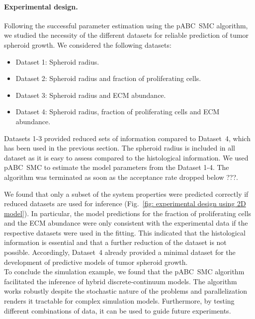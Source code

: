 \documentclass[10pt,letterpaper]{article}
\newcommand{\jh}[1]{{\color{red}#1}}
\begin{document}
\paragraph*{Experimental design.}
Following the successful parameter estimation using the pABC~SMC algorithm, we studied the necessity of the different datasets for reliable prediction of tumor spheroid growth. We considered the following datasets:
\begin{itemize}
\item Dataset 1: Spheroid radius.
\item Dataset 2: Spheroid radius and fraction of proliferating cells.
\item Dataset 3: Spheroid radius and ECM abundance.
\item Dataset 4: Spheroid radius, fraction of proliferating cells and ECM abundance.
\end{itemize}
Datasets 1-3 provided reduced sets of information compared to Dataset~4, which has been used in the previous section. The spheroid radius is included in all dataset as it is easy to assess compared to the histological information. We used pABC~SMC to estimate the model parameters from the Dataset 1-4. The algorithm was terminated as soon as the acceptance rate dropped below \jh{???}.

We found that only a subset of the system properties were predicted correctly if reduced datasets are used for inference (Fig.~\ref{fig: experimental design using 2D model}). In particular, the model predictions for the fraction of proliferating cells and the ECM abundance were only consistent with the experimental data if the respective datasets were used in the fitting. This indicated that the histological information is essential and that a further reduction of the dataset is not possible. Accordingly, Dataset~4 already provided a minimal dataset  for the development of predictive models of tumor spheroid growth.
%
\\[2ex]
\noindent To conclude the simulation example, we found that the pABC~SMC algorithm facilitated the inference of hybrid discrete-continuum models. The algorithm works robustly despite the stochastic nature of the problems and parallelization renders it tractable for complex simulation models. Furthermore, by testing different combinations of data, it can be used to guide future experiments.
\end{document}
